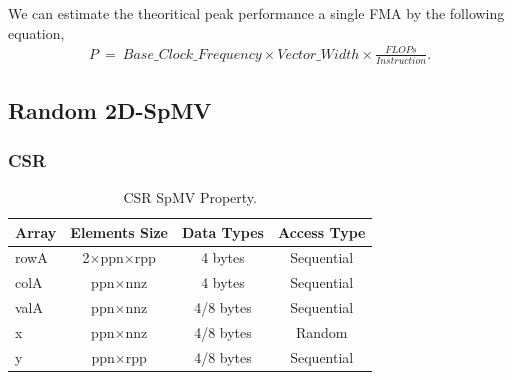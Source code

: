 \documentclass[conference, 10ppt]{IEEEtran}
\begin{document}

We can estimate the theoritical peak performance a single FMA by the following equation,
\begin{eqnarray}
P\ =\ Base\_Clock\_Frequency\times Vector\_Width\times \frac{FLOPs}{Instruction}.
\end{eqnarray}

\subsection{Random 2D-SpMV}
\subsubsection{CSR}
\begin{table}[htb]
\caption{CSR SpMV Property.}
\label{tab:csr-spmv-property}
\centering
\begin{tabular}[c]{| l | c | c | c |}
\hline
Array & Elements Size & Data Types & Access Type \\ \hline
rowA & 2$\times$ppn$\times$rpp & 4 bytes & Sequential \\ \hline
colA & ppn$\times$nnz & 4 bytes & Sequential \\ \hline
valA & ppn$\times$nnz & 4/8 bytes & Sequential \\ \hline
x & ppn$\times$nnz & 4/8 bytes & Random \\ \hline
y & ppn$\times$rpp & 4/8 bytes & Sequential \\ \hline
\end{tabular}
\end{table}
\end{document}
